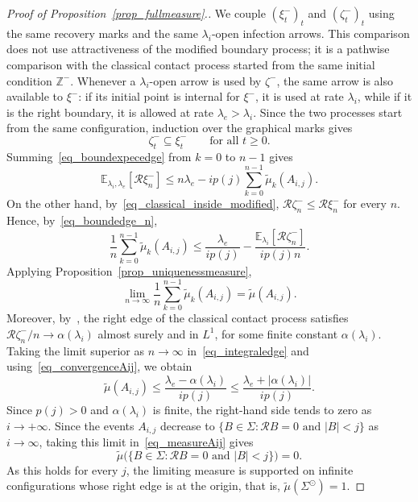 \documentclass[11pt,a4paper]{article}
\theoremstyle{plain}
\theoremstyle{definition}
\theoremstyle{remark}
\numberwithin{equation}{section}
\begin{document}
\begin{proof}[{Proof of Proposition~\ref{prop_fullmeasure}}.]
We couple $(\xi^-_t)_t$ and $(\zeta^-_t)_t$ using the same recovery
marks and the same $\lambda_i$-open infection arrows.  This comparison
does not use attractiveness of the modified boundary process; it is a
pathwise comparison with the classical contact process started from the
same initial condition $\mathbb Z^-$.  Whenever a $\lambda_i$-open arrow
is used by $\zeta^-$, the same arrow is also available to $\xi^-$: if
its initial point is internal for $\xi^-$, it is used at rate
$\lambda_i$, while if it is the right boundary, it is allowed at rate
$\lambda_e>\lambda_i$.  Since the two processes start from the same
configuration, induction over the graphical marks gives	\begin{equation} \label{eq_classical_inside_modified}
		\zeta^-_t\subseteq \xi^-_t
		\qquad\text{for all }t\geq0.
	\end{equation}
Summing~\eqref{eq_boundexpecedge} from $k=0$ to $n-1$ gives
	\begin{equation} \label{eq_boundedge_n}
		\mathbb{E}_{\lambda_i,\lambda_e}[\mathcal{R}\xi_n^-]
		\leq n\lambda_e-ip(j)\sum_{k=0}^{n-1}\tilde{\mu}_k(A_{i,j}).
	\end{equation}
	On the other hand, by~\eqref{eq_classical_inside_modified}, $\mathcal{R}\zeta_n^-\leq\mathcal{R}\xi_n^-$ for every $n$. Hence, by~\eqref{eq_boundedge_n},
	\begin{equation} \label{eq_integraledge}
		\frac{1}{n}\sum_{k=0}^{n-1}\tilde{\mu}_k(A_{i,j})
		\leq
		\frac{\lambda_e}{ip(j)}
		-
		\frac{\mathbb{E}_{\lambda_i}[\mathcal{R}\zeta_n^-]}{ip(j)n}.
	\end{equation}
	Applying Proposition~\ref{prop_uniquenessmeasure},
		\begin{equation} \label{eq_convergenceAij}
			\lim_{n\to\infty} \frac{1}{n}\sum_{k=0}^{n-1} \tilde{\mu}_k(A_{i,j}) = \tilde{\mu}(A_{i,j}).
		\end{equation}
	Moreover, by~\cite[Theorem VI.2.19]{Liggett05}, the right edge of the classical contact process satisfies $\mathcal{R}\zeta_n^-/n\to\alpha(\lambda_i)$ almost surely and in $L^1$, for some finite constant $\alpha(\lambda_i)$. Taking the limit superior as $n\to\infty$ in~\eqref{eq_integraledge} and using~\eqref{eq_convergenceAij}, we obtain
	\begin{equation}\label{eq_measureAij}
	\tilde{\mu}(A_{i,j})
	\leq
	\frac{\lambda_e-\alpha(\lambda_i)}{ip(j)}
	\leq
	\frac{\lambda_e+|\alpha(\lambda_i)|}{ip(j)}.
	\end{equation}
	Since $p(j)>0$ and $\alpha(\lambda_i)$ is finite, the right-hand side tends to zero as $i\to+\infty$.
	Since the events $A_{i,j}$ decrease to $\{B\in\Sigma:\mathcal{R}B=0\text{ and } |B|<j\}$ as $i\to\infty$, taking this limit in~\eqref{eq_measureAij} gives
		\[\tilde{\mu}\big(\{B\in\Sigma:\mathcal{R}B=0\text{ and }|B|<j\}\big)=0.\]
	As this holds for every $j$, the limiting measure is supported on infinite configurations whose right edge is at the origin, that is, $\tilde{\mu}(\Sigma^{\odot})=1$.
	\end{proof}
	
\end{document}
